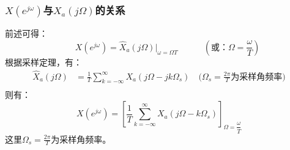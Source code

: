 \documentclass[notheorems,compress,mathserif,table]{beamer}
\begin{document}
\begin{frame}[shrink]\frametitle{$X(e^{j\omega})$与$X_a(j\Omega)$的关系}%
前述可得：
 $$\quad\quad X(e^{j\omega})  = \hat{X}_a(j\Omega)\big|_{\omega = \Omega T}\quad\quad\quad(\mbox{或：}\Omega=\frac{\omega}{T})$$
根据采样定理，有：
\begin{equation*}
        \begin{split}
        \hat{X}_a(j\Omega)  &= \frac{1}{T}\sum_{k=-\infty}^{\infty}X_a(j\Omega -j k \Omega_s) \quad\big(\Omega_s = \frac{2\pi}{T}\mbox{为采样角频率}\big)\\
        \end{split}
\end{equation*}
则有：
$$ X(e^{j\omega})   = \left[\frac{1}{T}\sum_{k=-\infty}^{\infty}X_a(j\Omega -k \Omega_s)\right]_{\Omega = \dfrac{\omega}{T}}$$
这里$\Omega_s = \frac{2\pi}{T}$为采样角频率。\newline
\end{frame}
%
%
%
\end{document}
